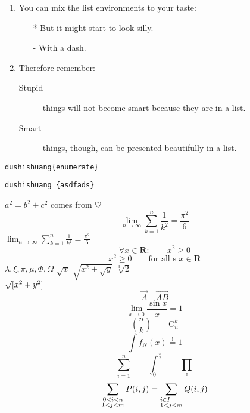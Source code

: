 \documentclass{book}
\begin{document}
\begin{enumerate}
\item You can mix the list
environments to your taste:
\begin{itemize}
\item[*] But it might start to
look silly.
\item[-] With a dash.
\end{itemize}
\item Therefore remember:
\begin{description}
\item[Stupid] things will not
become smart because they are
in a list.
\item[Smart] things, though,
can be presented beautifully
in a list.
\end{description}
\end{enumerate}
\verb|dushishuang{enumerate}|
\begin{verbatim} 
dushishuang {asdfads} 
\end{verbatim}
$a^{2}=b^{2} + c^{2}$
comes from \begin{math}\heartsuit\end{math}
\begin{displaymath}
\lim_{n \to \infty}
\sum_{k=1}^n \frac{1}{k^2}
= \frac{\pi^2}{6}
\end{displaymath}
$\lim_{n \to \infty}
\sum_{k=1}^n \frac{1}{k^2}
= \frac{\pi^2}{6}$
\begin{equation}
\forall x \in \mathbf{R}:
\qquad x^{2} \geq 0
\end{equation}
\begin{equation}
x^{2} \geq 0\qquad
\textrm{for all s }x\in\mathbf{R}
\end{equation}
$\lambda,\xi,\pi,\mu,\Phi,\Omega$
$\sqrt{x}$ \qquad
$\sqrt{ x^{2}+\sqrt{y} }$
\qquad $\sqrt[3]{2}$\\[3pt]
$\surd[x^2 + y^2]$
\begin{displaymath}
\vec A\quad\overrightarrow{AB}
\end{displaymath}
\[\lim_{x \rightarrow 0}
\frac{\sin x}{x}=1\]
\begin{displaymath}
\binom{n}{k}\qquad\mathrm{C}_n^k
\end{displaymath}
\begin{displaymath}
\int f_N(x) \stackrel{!}{=} 1
\end{displaymath}
\begin{displaymath}
\sum_{i=1}^{n} \qquad
\int_{0}^{\frac{\pi}{2}} \qquad
\prod_\epsilon
\end{displaymath}
\begin{displaymath}
\sum_{\substack{0<i<n \\ 1<j<m}}
P(i,j) =
\sum_{\begin{subarray}{l}
i\in I\\
1<j<m
\end{subarray}}
Q(i,j)
\end{displaymath}
\end{document}
